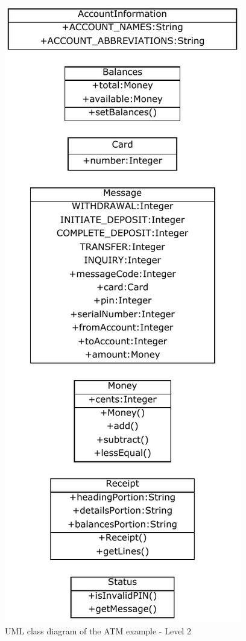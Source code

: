 \begin{figure}[!ht]
\begin{minipage}[b]{0.47\linewidth}
\label{fig:atmBanking1}
\end{minipage}
\quad
\begin{minipage}[b]{0.47\linewidth}
\includegraphics{Figures/Example2a2.pdf}
\caption{UML class diagram of the ATM example - Level 2}
\label{fig:atmBanking2}
\end{minipage}
\end{figure}

